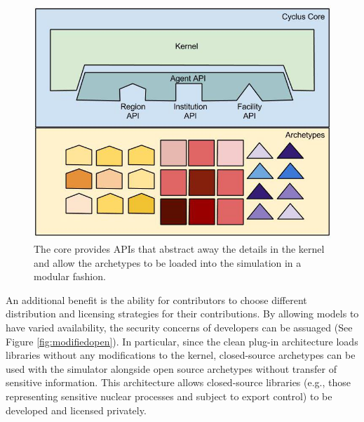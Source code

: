 \begin{figure}[htbp!]
\begin{center}
\includegraphics[width=\textwidth]{./images/framework}
\end{center}
\caption{The \Cyclus core provides \gls{API}s that abstract away the details in
the kernel and allow the archetypes to be loaded into the simulation in a modular
fashion.}
\label{fig:framework}
\end{figure}


An additional benefit is the ability for
contributors to choose different distribution and licensing strategies
for their contributions. By allowing models to have varied
availability, the security concerns of developers can be
assuaged (See Figure \ref{fig:modifiedopen}).
In particular, since the clean plug-in architecture loads libraries without any
modifications to the \Cyclus kernel, closed-source archetypes can be used with
the simulator alongside open source archetypes without transfer of sensitive information. This architecture
allows closed-source libraries (e.g., those representing sensitive nuclear
processes and subject to export control) to be developed and licensed privately.

